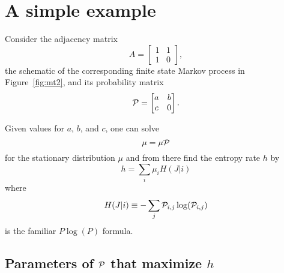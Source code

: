 \documentclass[12pt]{article} \usepackage{amsmath,amsfonts}
\newcommand{\T}{{\cal P}}
\begin{document}
\section{A simple example}
\label{sec:example}

Consider the adjacency matrix
\begin{equation}
  \label{eq:A}
  A = \begin{bmatrix} 1 & 1 \\ 1 & 0 \end{bmatrix},
\end{equation}
the schematic of the corresponding finite state Markov process in
Figure~\ref{fig:mt2}, and its probability matrix
\begin{equation}
  \label{eq:T}
  \T = \begin{bmatrix} a & b \\ c & 0 \end{bmatrix}.
\end{equation}

\begin{figure*}
  \centering
  \resizebox{0.4\textwidth}{!}{ }
  \caption{A schematic of the finite state Markov process specified by
  Equation~\eqref{eq:T}.}
  \label{fig:mt2}
\end{figure*}

Given values for $a$, $b$, and $c$, one can solve
\begin{equation}
  \label{eq:stationary}
  \mu = \mu \T
\end{equation}
for the stationary distribution $\mu$ and from there find the entropy
rate $h$ by
\begin{equation}
  \label{eq:rate}
  h = \sum_i \mu_i H(J|i)
\end{equation}
where
\begin{equation*}
  H(J|i) \equiv -\sum_j \T_{i,j} \log (\T_{i,j})
\end{equation*}
is the familiar $P\log(P)$ formula.

\subsection{Parameters of $\T$ that maximize $h$}
\label{sec:max}
\end{document}
